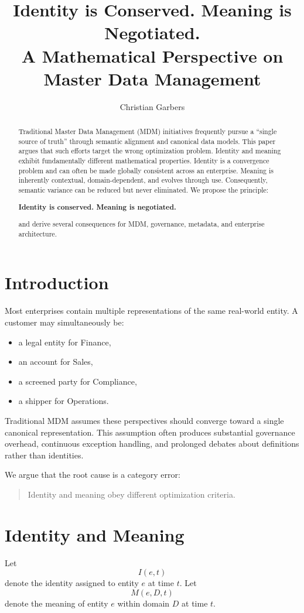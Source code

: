 \documentclass[11pt]{article}
\title{Identity is Conserved. Meaning is Negotiated.\\
A Mathematical Perspective on Master Data Management}
\author{Christian Garbers}
\date{}
\begin{document}
\maketitle

\begin{abstract}
Traditional Master Data Management (MDM) initiatives frequently pursue a ``single source of truth'' through semantic alignment and canonical data models. This paper argues that such efforts target the wrong optimization problem. Identity and meaning exhibit fundamentally different mathematical properties. Identity is a convergence problem and can often be made globally consistent across an enterprise. Meaning is inherently contextual, domain-dependent, and evolves through use. Consequently, semantic variance can be reduced but never eliminated. We propose the principle:
\begin{center}
\textbf{Identity is conserved. Meaning is negotiated.}
\end{center}
and derive several consequences for MDM, governance, metadata, and enterprise architecture.
\end{abstract}

\section{Introduction}
Most enterprises contain multiple representations of the same real-world entity. A customer may simultaneously be:
\begin{itemize}
\item a legal entity for Finance,
\item an account for Sales,
\item a screened party for Compliance,
\item a shipper for Operations.
\end{itemize}
Traditional MDM assumes these perspectives should converge toward a single canonical representation. This assumption often produces substantial governance overhead, continuous exception handling, and prolonged debates about definitions rather than identities.

We argue that the root cause is a category error:
\begin{quote}
Identity and meaning obey different optimization criteria.
\end{quote}

\section{Identity and Meaning}
Let
\[
I(e,t)
\]
denote the identity assigned to entity $e$ at time $t$. Let
\[
M(e,D,t)
\]
denote the meaning of entity $e$ within domain $D$ at time $t$.
\end{document}
